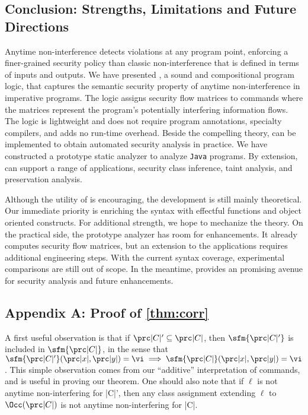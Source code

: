 \subsection{Conclusion: Strengths, Limitations and Future Directions}
\label{sec:conclusion}

Anytime non-interference detects violations at any program point, enforcing a finer-grained security policy than classic non-interference that is defined in terms of inputs and outputs.
We have presented \lname, a sound and compositional program logic, that captures the semantic security property of anytime non-interference in imperative programs.
The logic assigns security flow matrices to commands where the matrices represent the program's potentially interfering information flows.
The logic is lightweight and does not require program annotations, specialty compilers, and adds no run-time overhead.
Beside the compelling theory, \lname can be implemented to obtain automated security analysis in practice.
We have constructed a prototype static analyzer \tool to analyze \texttt{Java} programs.
By extension, \tool can support a range of applications, \eg security class inference, taint analysis, and preservation analysis.

Although the utility of \lname is encouraging, the development is still mainly theoretical.
Our immediate priority is enriching the syntax with effectful functions and object oriented constructs. %
For additional strength, we hope to mechanize the theory.
On the practical side, the prototype analyzer has room for enhancements.
It already computes security flow matrices, but an extension to the applications requires additional engineering steps.
With the current syntax coverage, experimental comparisons are still out of scope.
In the meantime, \lname provides an promising avenue for security analysis and future enhancements.

\subsection{Appendix A: Proof of %
\autoref{thm:corr}}%
\label{app:proof}

A first useful observation is that if \(\prc|C|' \subseteq \prc|C|\), then \(\sfm{\prc|C|'}\) is included in \(\sfm{\prc|C|}\), in the sense that \(\sfm{\prc|C|'}(\prc|x|, \prc|y|) = \vi \implies \sfm{\prc|C|}(\prc|x|, \prc|y|) = \vi\).
This simple observation comes from our \enquote{additive} interpretation of commands, and is useful in proving our theorem.
One should also note that if \(\ell\) is not anytime non-interfering for \prc|C|', then any class assignment extending \(\ell\) to \(\Occ(\prc|C|)\) is not anytime non-interfering for \prc|C|.


